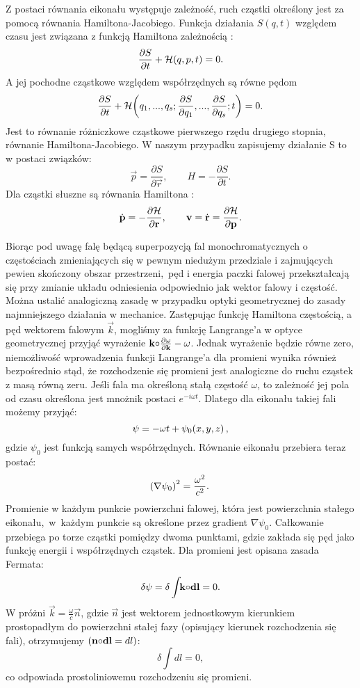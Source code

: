 \indent Z postaci równania eikonału występuje zależność, ruch cząstki określony jest za pomocą równania Hamiltona-Jacobiego.
Funkcja działania $S(q,t)$ względem czasu jest związana z funkcją Hamiltona zależnością \cite{TeoriaPolaLifszyc}:
$$\frac{\partial S}{\partial t}+{\cal H}\!\br{q,p,t}=0.$$
A jej pochodne cząstkowe względem współrzędnych są równe pędom
%
%
$$\frac{\partial S}{\partial t}+{\cal H}\!\br{q_{1},...,q_{s};\frac{\partial S}{\partial q_{1}},...,\frac{\partial S}{\partial q_{s}};t}=0.$$
%
Jest to równanie różniczkowe cząstkowe pierwszego rzędu drugiego stopnia, równanie Hamiltona-Jacobiego.
%
W naszym przypadku zapisujemy działanie S to w postaci związków:
%
$$\vec{p}=\frac{\partial S}{\partial \vec{r}},\qquad H=-\frac{\partial S}{\partial t}.$$
%
Dla cząstki słuszne są równania Hamiltona :
%
$$\dot{\vec{p}}=-\frac{\partial {\cal H}}{\partial \vec{r}},\qquad \vec{v}=\dot{\vec{r}}=\frac{\partial {\cal H}}{\partial \vec{p}}.$$
%

\noindent Biorąc pod uwagę falę będącą superpozycją fal monochromatycznych o częstościach zmieniających się w pewnym niedużym przedziale i zajmujących pewien skończony obszar przestrzeni,~pęd i energia paczki falowej przekształcają się przy zmianie układu odniesienia odpowiednio jak wektor falowy i częstość. Można ustalić analogiczną zasadę w przypadku optyki geometrycznej do zasady najmniejszego działania w mechanice. Zastępując funkcję Hamiltona częstością, a pęd wektorem falowym $\vec{k}$, mogliśmy za funkcję Langrange’a w optyce geometrycznej przyjąć wyrażenie $\sprod{\vec{k}}{\frac{\partial \omega}{\partial \vec{k}}}-\omega$. Jednak wyrażenie będzie równe zero, niemożliwość wprowadzenia funkcji Langrange’a dla promieni wynika również bezpośrednio stąd, że rozchodzenie się promieni jest analogiczne do ruchu cząstek z masą równą zeru. Jeśli fala ma określoną stałą częstość $\omega$, to zależność jej pola od czasu określona jest mnożnik postaci $e^{-i\omega t}$. Dlatego dla eikonału takiej fali możemy przyjąć:
%
$$\psi=-\omega t + \psi_{0}\!\br{x,y,z},$$
%
gdzie $\psi_{0}$ jest funkcją samych współrzędnych. Równanie eikonału przebiera teraz postać:
%
$$\!\br{\grad{\psi_{0}}}^{2}=\frac{\omega^{2}}{c^2}.$$
%
Promienie w każdym punkcie powierzchni falowej, która jest powierzchnia stałego eikonału,~w~każdym punkcie są określone przez gradient $\nabla \psi_{0}$. Całkowanie przebiega po torze cząstki pomiędzy dwoma punktami, gdzie zakłada się pęd jako funkcję energii i współrzędnych cząstek. Dla promieni jest opisana zasada Fermata:
%
$$\delta \psi=\delta \int\!\! \sprod{\vec{k}}{d\vec{l}}=0.$$
%
W próżni $\vec{k}=\frac{\omega}{c}\vec{n}$, gdzie $\vec{n}$ jest wektorem jednostkowym kierunkiem prostopadłym do powierzchni stałej fazy (opisujący kierunek rozchodzenia się fali), otrzymujemy $(\sprod{\vec{n}}{d\vec{l}}=dl)$:
%
$$\delta \int\!\! dl = 0,$$
%
co odpowiada prostoliniowemu rozchodzeniu się promieni.
